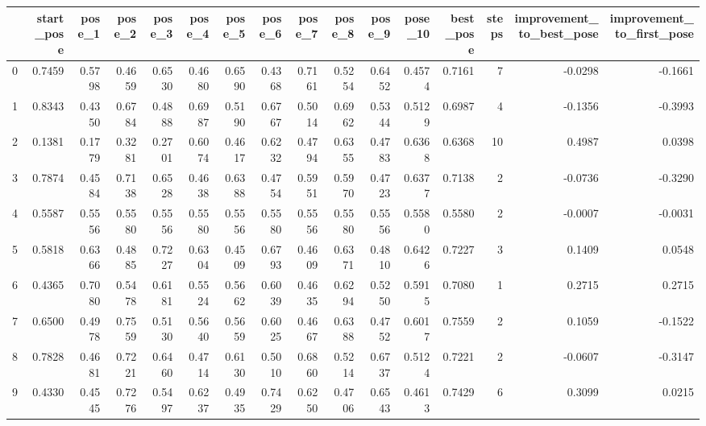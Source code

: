 \begin{tabular}{lrrrrrrrrrrrrrrr}
\toprule
{} &  start\_pose &  pose\_1 &  pose\_2 &  pose\_3 &  pose\_4 &  pose\_5 &  pose\_6 &  pose\_7 &  pose\_8 &  pose\_9 &  pose\_10 &  best\_pose &  steps &  improvement\_to\_best\_pose &  improvement\_to\_first\_pose \\
\midrule
0 &      0.7459 &  0.5798 &  0.4659 &  0.6530 &  0.4680 &  0.6590 &  0.4368 &  0.7161 &  0.5254 &  0.6452 &   0.4574 &     0.7161 &      7 &                   -0.0298 &                    -0.1661 \\
1 &      0.8343 &  0.4350 &  0.6784 &  0.4888 &  0.6987 &  0.5190 &  0.6767 &  0.5014 &  0.6962 &  0.5344 &   0.5129 &     0.6987 &      4 &                   -0.1356 &                    -0.3993 \\
2 &      0.1381 &  0.1779 &  0.3281 &  0.2701 &  0.6074 &  0.4617 &  0.6232 &  0.4794 &  0.6355 &  0.4783 &   0.6368 &     0.6368 &     10 &                    0.4987 &                     0.0398 \\
3 &      0.7874 &  0.4584 &  0.7138 &  0.6528 &  0.4638 &  0.6388 &  0.4754 &  0.5951 &  0.5970 &  0.4723 &   0.6377 &     0.7138 &      2 &                   -0.0736 &                    -0.3290 \\
4 &      0.5587 &  0.5556 &  0.5580 &  0.5556 &  0.5580 &  0.5556 &  0.5580 &  0.5556 &  0.5580 &  0.5556 &   0.5580 &     0.5580 &      2 &                   -0.0007 &                    -0.0031 \\
5 &      0.5818 &  0.6366 &  0.4885 &  0.7227 &  0.6304 &  0.4509 &  0.6793 &  0.4609 &  0.6371 &  0.4810 &   0.6426 &     0.7227 &      3 &                    0.1409 &                     0.0548 \\
6 &      0.4365 &  0.7080 &  0.5478 &  0.6181 &  0.5524 &  0.5662 &  0.6039 &  0.4635 &  0.6294 &  0.5250 &   0.5915 &     0.7080 &      1 &                    0.2715 &                     0.2715 \\
7 &      0.6500 &  0.4978 &  0.7559 &  0.5130 &  0.5640 &  0.5659 &  0.6025 &  0.4667 &  0.6388 &  0.4752 &   0.6017 &     0.7559 &      2 &                    0.1059 &                    -0.1522 \\
8 &      0.7828 &  0.4681 &  0.7221 &  0.6460 &  0.4714 &  0.6130 &  0.5010 &  0.6860 &  0.5214 &  0.6737 &   0.5124 &     0.7221 &      2 &                   -0.0607 &                    -0.3147 \\
9 &      0.4330 &  0.4545 &  0.7276 &  0.5497 &  0.6237 &  0.4935 &  0.7429 &  0.6250 &  0.4706 &  0.6543 &   0.4613 &     0.7429 &      6 &                    0.3099 &                     0.0215 \\
\bottomrule
\end{tabular}
